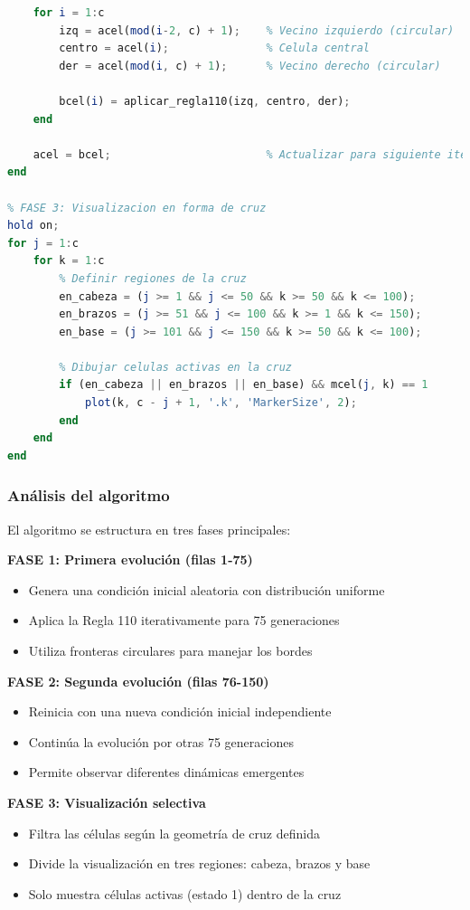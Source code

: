\documentclass[a4paper,12pt]{article}
\theoremstyle{mytheor}
\begin{document}
\begin{lstlisting}[language=Octave, breaklines=true]
    % Calcular proxima generacion
    for i = 1:c
        izq = acel(mod(i-2, c) + 1);    % Vecino izquierdo (circular)
        centro = acel(i);               % Celula central
        der = acel(mod(i, c) + 1);      % Vecino derecho (circular)
        
        bcel(i) = aplicar_regla110(izq, centro, der);
    end
    
    acel = bcel;                        % Actualizar para siguiente iteracion
end

% FASE 3: Visualizacion en forma de cruz
hold on;
for j = 1:c
    for k = 1:c
        % Definir regiones de la cruz
        en_cabeza = (j >= 1 && j <= 50 && k >= 50 && k <= 100);
        en_brazos = (j >= 51 && j <= 100 && k >= 1 && k <= 150);
        en_base = (j >= 101 && j <= 150 && k >= 50 && k <= 100);
        
        % Dibujar celulas activas en la cruz
        if (en_cabeza || en_brazos || en_base) && mcel(j, k) == 1
            plot(k, c - j + 1, '.k', 'MarkerSize', 2);
        end
    end
end
\end{lstlisting}


\subsubsection{Análisis del algoritmo}

El algoritmo se estructura en tres fases principales:

\textbf{FASE 1: Primera evolución (filas 1-75)}
\begin{itemize}
    \item Genera una condición inicial aleatoria con distribución uniforme
    \item Aplica la Regla 110 iterativamente para 75 generaciones
    \item Utiliza fronteras circulares para manejar los bordes
\end{itemize}

\textbf{FASE 2: Segunda evolución (filas 76-150)}
\begin{itemize}
    \item Reinicia con una nueva condición inicial independiente
    \item Continúa la evolución por otras 75 generaciones
    \item Permite observar diferentes dinámicas emergentes
\end{itemize}

\textbf{FASE 3: Visualización selectiva}
\begin{itemize}
    \item Filtra las células según la geometría de cruz definida
    \item Divide la visualización en tres regiones: cabeza, brazos y base
    \item Solo muestra células activas (estado 1) dentro de la cruz
\end{itemize}
\end{document}
